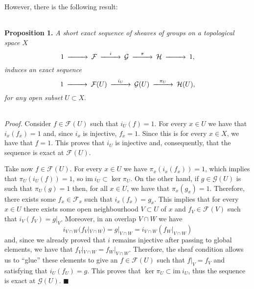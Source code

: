 \documentclass[12pt,a4paper]{article}
\begin{document}
    However, there is the following result:

    \ \\
    \textbf{Proposition 1.} \textit{A short exact sequence of sheaves of groups on a topological space $X$}
    \begin{equation*}
      \begin{CD}
1 @>>>	\mathcal{F} @> i >> \mathcal{G} @> \pi >> \mathcal{H} @>>> 1,
      \end{CD}
    \end{equation*}
    \textit{induces an exact sequence}
    \begin{equation*}
      \begin{CD}
1 @>>>	\mathcal{F}(U) @> i_U >> \mathcal{G}(U) @> \pi_U >> \mathcal{H}(U),
      \end{CD}
    \end{equation*}
    \textit{for any open subset} $U\subset X$.

    \ \\
    \textit{Proof.} Consider $f\in \mathcal{F}(U)$ such that $i_U(f)=1$. For every $x\in U$ we have that $i_x(f_x)=1$ and, since $i_x$ is injective, $f_x=1$. Since this is for every $x\in X$, we have that $f=1$. This proves that $i_U$ is injective and, consequently, that the sequence is exact at $\mathcal{F}(U)$.

    Take now $f\in \mathcal{F}(U)$. For every $x\in U$ we have $\pi_x(i_x(f_x))=1$, which implies that $\pi_U(i_U(f))=1$, so $\mathrm{im}\ i_U \subset \ker \pi_U$. On the other hand, if $g\in \mathcal{G}(U)$ is such that $\pi_U(g)=1$ then, for all $x\in U$, we have that $\pi_x(g_x)=1$. Therefore, there exists some $f_x \in \mathcal{F}_x$ such that $i_x(f_x)=g_x$. This implies that for every $x\in U$ there exists some open neighbourhood $V\subset U$ of $x$ and $f_V \in \mathcal{F}(V)$ such that $i_V(f_V)=g|_V$. Moreover, in an overlap $V\cap W$ we have
    \begin{equation*}
      i_{V\cap W}( f_V|_{V\cap W})= g|_{V\cap W} = i_{V\cap W}(f_W|_{V\cap W})
    \end{equation*}
    and, since we already proved that $i$ remains injective after passing to global elements, we have that $ f_V|_{V\cap W}=f_W|_{V\cap W}$. Therefore, the sheaf condition allows us to ``glue'' these elements to give an $f \in \mathcal{F}(U)$ such that $f|_V=f_V$ and satisfying that $i_U(f_U)=g$. This proves that $\ker \pi_U \subset \mathrm{im}\ i_U$, thus the sequence is exact at $\mathcal{G}(U)$. \hfill $\blacksquare$
    \ \\
\end{document}

